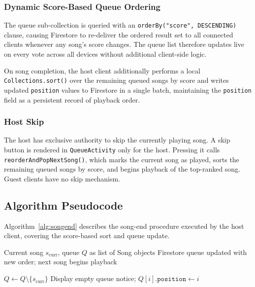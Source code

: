 \documentclass[pdflatex,sn-mathphys-num,iicol]{sn-jnl}
\theoremstyle{thmstyleone}%
\theoremstyle{thmstyletwo}%
\theoremstyle{thmstylethree}%
\begin{document}
\subsubsection{Dynamic Score-Based Queue Ordering}

The queue sub-collection is queried with an \texttt{orderBy("score", DESCENDING)}
clause, causing Firestore to re-deliver the ordered result set to all connected clients
whenever any song's score changes. The queue list therefore updates live on every vote
across all devices without additional client-side logic.

On song completion, the host client additionally performs a local
\texttt{Collections.sort()} over the remaining queued songs by score and writes
updated \texttt{position} values to Firestore in a single batch, maintaining the
\texttt{position} field as a persistent record of playback order.


\subsubsection{Host Skip}

The host has exclusive authority to skip the currently playing song. A skip button
is rendered in \texttt{QueueActivity} only for the host. Pressing it calls
\texttt{reorderAndPopNextSong()}, which marks the current song as played, sorts the
remaining queued songs by score, and begins playback of the top-ranked song.
Guest clients have no skip mechanism.

\subsection{Algorithm Pseudocode}

Algorithm~\ref{alg:songend} describes the song-end procedure executed by the host
client, covering the score-based sort and queue update.

\begin{algorithm}
\caption{Host Song-End Procedure}
\label{alg:songend}
\begin{algorithmic}[1]
\Require Current song $s_{\text{curr}}$, queue $Q$ as list of Song objects
\Ensure Firestore queue updated with new order; next song begins playback

    \State $Q \gets Q \setminus \{s_{\text{curr}}\}$
    \State {}
        \State Display empty queue notice; \Return
    \EndIf
    \State {}
        \State $Q[i].\texttt{position} \gets i$
    \EndFor
    \State {}
    \State {}
    \State {}
\EndFunction
\end{algorithmic}
\end{algorithm}
\end{document}
